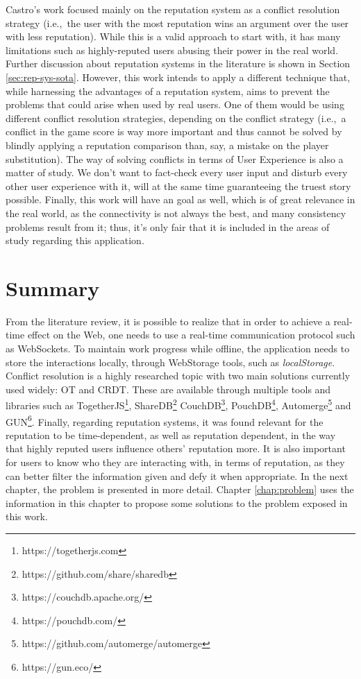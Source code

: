 Castro's work focused mainly on the reputation system as a conflict resolution strategy (i.e.,\ the user with the most reputation wins an argument over the user with less reputation). While this is a valid approach to start with, it has many limitations such as highly-reputed users abusing their power in the real world. Further discussion about reputation systems in the literature is shown in Section \ref{sec:rep-sys-sota}. However, this work intends to apply a different technique that, while harnessing the advantages of a reputation system, aims to prevent the problems that could arise when used by real users. One of them would be using different conflict resolution strategies, depending on the conflict strategy (i.e.,\ a conflict in the game score is way more important and thus cannot be solved by blindly applying a reputation comparison than, say, a mistake on the player substitution). The way of solving conflicts in terms of User Experience is also a matter of study. We don't want to fact-check every user input and disturb every other user experience with it, will at the same time guaranteeing the truest story possible. Finally, this work will have an  goal as well, which is of great relevance in the real world, as the connectivity is not always the best, and many consistency problems result from it; thus, it's only fair that it is included in the areas of study regarding this application.

\section{Summary}

From the literature review, it is possible to realize that in order to achieve a real-time effect on the Web, one needs to use a real-time communication protocol such as WebSockets. To maintain work progress while offline, the application needs to store the interactions locally, through WebStorage tools, such as \textit{localStorage}. Conflict resolution is a highly researched topic with two main solutions currently used widely: OT and CRDT. These are available through multiple tools and libraries such as TogetherJS\footnote{https://togetherjs.com}, ShareDB\footnote{https://github.com/share/sharedb} CouchDB\footnote{https://couchdb.apache.org/}, PouchDB\footnote{https://pouchdb.com/}, Automerge\footnote{https://github.com/automerge/automerge} and GUN\footnote{https://gun.eco/}. Finally, regarding reputation systems, it was found relevant for the reputation to be time-dependent, as well as reputation dependent, in the way that highly reputed users influence others' reputation more. It is also important for users to know who they are interacting with, in terms of reputation, as they can better filter the information given and defy it when appropriate. In the next chapter, the problem is presented in more detail. Chapter \ref{chap:problem} uses the information in this chapter to propose some solutions to the problem exposed in this work. 